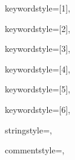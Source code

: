 {%
keywordstyle=[1]{\bfseries\ttfamily\color{purple}},

keywordstyle=[2]{\ttfamily\color{dkgreen}},

keywordstyle=[3]{\ttfamily\color{dkgreen}},

keywordstyle=[4]{\ttfamily\color{dkblue}},

keywordstyle=[5]{\ttfamily\color{red}},

keywordstyle=[6]{\bfseries\ttfamily\color{dkpink}},

stringstyle={\bfseries\ttfamily\color{dkblue}},

commentstyle={\bfseries\ttfamily\color{dkred}},


}

